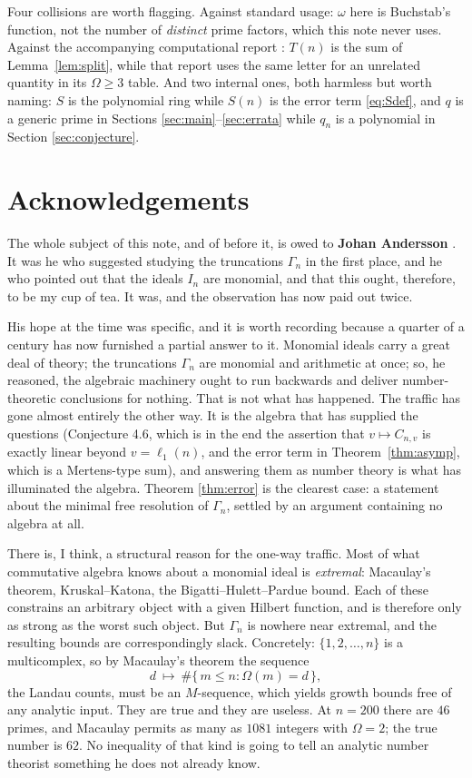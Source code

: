 \documentclass[a4paper,11pt,oneside,reqno]{amsart}
\theoremstyle{definition}
\theoremstyle{remark}
\theoremstyle{plain}
\newcommand{\Om}{\Omega}
\newcommand{\Gam}{\Gamma}
\begin{document}
\endgroup

Four collisions are worth flagging. Against standard usage: \(\omega\) here is
Buchstab's function, not the number of \emph{distinct} prime factors, which this
note never uses. Against the accompanying computational report \cite{gitrepo}:
\(T(n)\) is the sum of Lemma~\ref{lem:split}, while that report uses the same
letter for an unrelated quantity in its \(\Om \ge 3\) table. And two internal ones,
both harmless but worth naming: \(S\) is the polynomial ring while \(S(n)\) is
the error term \eqref{eq:Sdef}, and \(q\) is a generic prime in Sections
\ref{sec:main}--\ref{sec:errata} while \(q_n\) is a polynomial in Section
\ref{sec:conjecture}.

\section*{Acknowledgements}

The whole subject of this note, and of \cite{Snellman2000} before it, is owed
to \textbf{Johan Andersson} . It was he who
suggested studying the truncations \(\Gam_n\) in the first place, and he who
pointed out that the ideals \(I_n\) are monomial, and that this ought,
therefore, to be my cup of tea. It was, and the observation has now paid out
twice.

His hope at the time was specific, and it is worth recording because a quarter
of a century has now furnished a partial answer to it. Monomial ideals carry a
great deal of theory; the truncations \(\Gam_n\) are monomial and arithmetic at
once; so, he reasoned, the algebraic machinery ought to run backwards and
deliver number-theoretic conclusions for nothing. That is not what has happened.
The traffic has gone almost entirely the other way. It is the algebra that has
supplied the questions (Conjecture 4.6, which is in the end the assertion
that \(v\mapsto C_{n,v}\) is exactly linear beyond \(v = \ell_1(n)\), and the error
term in Theorem~\ref{thm:asymp}, which is a Mertens-type sum), and answering
them as number theory is what has illuminated the algebra. Theorem
\ref{thm:error} is the clearest case: a statement about the minimal free
resolution of \(\Gam_n\), settled by an argument containing no algebra at all.

There is, I think, a structural reason for the one-way traffic. Most of what commutative algebra knows about
a monomial ideal is \emph{extremal}: Macaulay's theorem, Kruskal--Katona, the
Bigatti--Hulett--Pardue bound. Each of these constrains an arbitrary object with
a given Hilbert function, and is therefore only as strong as the worst such
object. But \(\Gam_n\) is nowhere near extremal, and the resulting bounds are
correspondingly slack. Concretely: \(\{1,2,\dots,n\}\) is a multicomplex, so by
Macaulay's theorem the sequence
\[
  d\ \longmapsto\ \#\{\,m \le n : \Om(m) = d\,\},
\]
the Landau counts, must be an \(M\)-sequence, which yields growth bounds free of
any analytic input. They are true and they are useless. At \(n = 200\) there are
\(46\) primes, and Macaulay permits as many as \(1081\) integers with
\(\Om = 2\); the true number is \(62\). No inequality of that kind is going to
tell an analytic number theorist something he does not already know.
\end{document}
